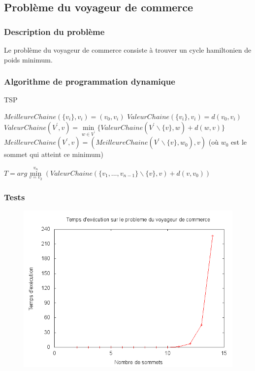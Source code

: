\subsection{Problème du voyageur de commerce}

\subsubsection{Description du problème}
Le problème du voyageur de commerce consiste à trouver un cycle hamiltonien de poids minimum.
\subsubsection{Algorithme de programmation dynamique}

\begin{algorithm}[H]
	\caption{TSP}
	\begin{algorithmic}[1]
			\STATE $MeilleureChaine(\{v_i\},v_i) = (v_0, v_i)$
			\STATE $ValeurChaine(\{v_i\},v_i) = d(v_0, v_i)$
		\ENDFOR
					\STATE $ValeurChaine(V^{'},v) = \min\limits_{w \in V^{'}}\{ValeurChaine(V^{'}\backslash \{v\},w)+d(w,v)\}$
					\STATE $MeilleureChaine(V^{'},v) = (MeilleureChaine(V^{'}\backslash \{v\},w_0),v)$ (où $w_0$ est le sommet qui atteint ce minimum)
				\ENDFOR
			\ENDFOR
		\ENDFOR
		
		\RETURN $T=arg \min\limits_{v=v_2}^{v_n}(ValeurChaine(\{v_1,\ldots,v_{n-1}\}\backslash \{v\},v)+d(v,v_0))$
	\end{algorithmic}
\end{algorithm}


\subsubsection{Tests}

\begin{figure}[H]
	\includegraphics[width=\linewidth]{../pratique/prog_dynamique_dev/res/tsp.png}
\end{figure}


